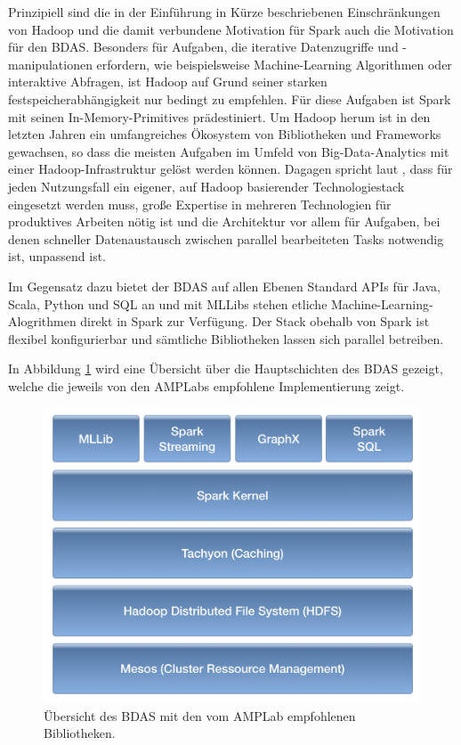 Prinzipiell sind die in der Einführung in Kürze beschriebenen Einschränkungen von Hadoop und die damit verbundene Motivation für Spark auch die Motivation für den BDAS. Besonders für Aufgaben, die iterative Datenzugriffe und -manipulationen erfordern, wie beispielsweise Machine-Learning Algorithmen oder interaktive Abfragen, ist Hadoop auf Grund seiner starken festspeicherabhängigkeit nur bedingt zu empfehlen. Für diese Aufgaben ist Spark mit seinen In-Memory-Primitives prädestiniert. Um Hadoop herum ist in den letzten Jahren ein umfangreiches Ökosystem von Bibliotheken und Frameworks gewachsen, so dass die meisten Aufgaben im Umfeld von Big-Data-Analytics mit einer Hadoop-Infrastruktur gelöst werden können. Dagagen spricht laut , dass für jeden Nutzungsfall ein eigener, auf Hadoop basierender Technologiestack eingesetzt werden muss, große Expertise in mehreren Technologien für produktives Arbeiten nötig ist und die Architektur vor allem für Aufgaben, bei denen schneller Datenaustausch zwischen parallel bearbeiteten Tasks notwendig ist, unpassend ist. 

Im Gegensatz dazu bietet der BDAS auf allen Ebenen Standard APIs für Java, Scala, Python und SQL an und mit MLLibs stehen etliche Machine-Learning-Alogrithmen direkt in Spark zur Verfügung. Der Stack obehalb von Spark ist flexibel konfigurierbar und sämtliche Bibliotheken lassen sich parallel betreiben. 


In Abbildung \ref{fig:BDAS1} wird eine Übersicht über die Hauptschichten des BDAS gezeigt, welche die jeweils von den AMPLabs empfohlene Implementierung zeigt.

\begin{figure}[htb!]
\centering
\includegraphics[width=1.0\textwidth]{bilder/BDAS.png}
\caption{Übersicht des BDAS mit den vom AMPLab empfohlenen Bibliotheken.}
\label{fig:BDAS1}
\end{figure}
 
